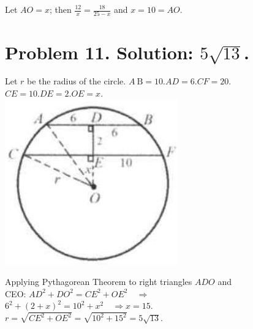 \documentclass[10pt]{article}
\begin{document}
Let \(A O=x\); then \(\frac{12}{x}=\frac{18}{25-x}\) and \(x=10=A O\).

\section*{Problem 11. Solution: \(5 \sqrt{13}\).}
Let \(r\) be the radius of the circle. \(A \mathrm{~B}=10 . A D=6 . C F=20\). \(C E=10 . D E=2 . O E=x\).\\
\includegraphics[max width=\textwidth, center]{2025_04_17_97bc1f7e44d93c271a88g-160(3)}

Applying Pythagorean Theorem to right triangles \(A D O\) and\\
CEO: \(A D^{2}+D O^{2}=C E^{2}+O E^{2} \quad \Rightarrow\)\\
\(6^{2}+(2+x)^{2}=10^{2}+x^{2} \quad \Rightarrow x=15\).\\
\(r=\sqrt{C E^{2}+O E^{2}}=\sqrt{10^{2}+15^{2}}=5 \sqrt{13}\).
\end{document}
